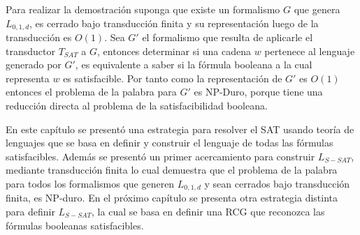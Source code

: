 Para realizar la demostración suponga que existe un formalismo $G$ que genera $L_{0,1,d}$, es cerrado bajo transducción finita y su representación
luego de la transducción es $O(1)$.
Sea $G'$ el formalismo que resulta de aplicarle el transductor $T_{SAT}$ a $G$, entonces determinar
si una cadena $w$ pertenece al lenguaje generado por $G'$, es equivalente a saber si la fórmula
booleana a la cual representa $w$ es satisfacible. Por tanto como la representación de $G'$ es $O(1)$
entonces el problema de la palabra para $G'$ es NP-Duro, porque tiene una reducción directa al problema
de la satisfacibilidad booleana.

En este capítulo se presentó una estrategia para resolver el SAT usando teoría de lenguajes que se basa en
definir y construir el lenguaje de todas las fórmulas satisfacibles. Además se presentó un primer acercamiento
para construir $L_{S-SAT}$, mediante transducción finita lo cual demuestra que el problema de la palabra para
todos los formalismos que generen $L_{0,1,d}$ y sean cerrados bajo transducción finita, es NP-duro.
En el próximo capítulo se presenta otra estrategia distinta para definir $L_{S-SAT}$, la cual se
basa en definir una RCG que reconozca las fórmulas booleanas satisfacibles.
